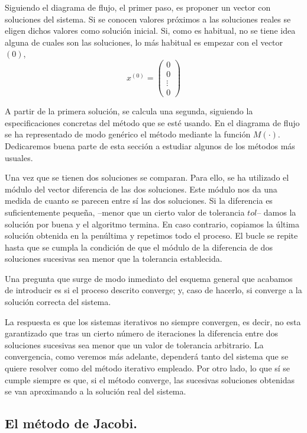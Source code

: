 Siguiendo el diagrama de flujo, el primer paso, es proponer un vector con soluciones del sistema. Si se conocen valores próximos a las soluciones reales se eligen dichos valores como solución inicial. Si, como es habitual, no se tiene idea alguna de cuales son las soluciones, lo más habitual es empezar con el vector $(0)$,
\begin{equation*}
x^{(0)}=\begin{pmatrix}
0\\
0\\
\vdots \\
0
\end{pmatrix}
\end{equation*}

A partir de la primera solución, se calcula una segunda, siguiendo la especificaciones concretas del método que se esté usando. En el diagrama de flujo se ha representado de modo genérico el método mediante la función $M(\cdot)$. Dedicaremos buena parte de esta sección a estudiar algunos de los métodos más usuales.

Una vez que se tienen dos soluciones se comparan. Para ello, se ha utilizado el módulo del vector diferencia de las dos soluciones. Este módulo nos da una medida de cuanto se parecen entre sí las dos soluciones. Si la diferencia es suficientemente pequeña, --menor que un cierto valor de tolerancia $tol$-- damos la solución por buena y el algoritmo termina. En caso contrario, copiamos la última solución obtenida en la penúltima y repetimos todo el proceso. El bucle se repite hasta que se cumpla la condición de que el módulo de la diferencia de dos soluciones sucesivas sea menor que la tolerancia establecida.

Una pregunta que surge de modo inmediato del esquema general que acabamos de introducir es si el proceso descrito converge; y, caso de hacerlo, si converge a la solución correcta del sistema. 

La respuesta es que los sistemas iterativos no siempre convergen, es decir, no esta garantizado que tras un cierto número de iteraciones la diferencia entre dos soluciones sucesivas sea menor que un valor de tolerancia arbitrario. La convergencia, como veremos más adelante, dependerá tanto del sistema que se quiere resolver como del método iterativo empleado. Por otro lado, lo que sí se cumple siempre es que, si el método converge, las sucesivas soluciones obtenidas se van aproximando a la solución real del sistema.

\subsection{El método de Jacobi.} 

